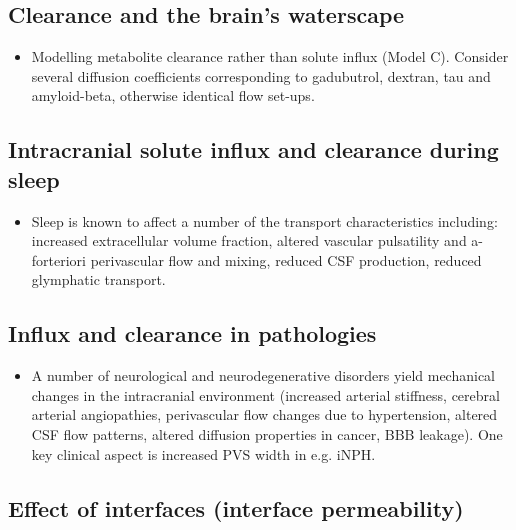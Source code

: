 \documentclass[fleqn,10pt]{wlscirep}
\newcommand{\draft}[1]{\textcolor{gray}{#1}}
\begin{document}
\draft{\lipsum[1]}

\subsection*{Clearance and the brain's waterscape}

\draft{\lipsum[1]}

\begin{itemize}
\item 
  Modelling metabolite clearance rather than solute influx (Model
  C). Consider several diffusion coefficients corresponding to
  gadubutrol, dextran, tau and amyloid-beta, otherwise identical flow
  set-ups.
\end{itemize}

\subsection*{Intracranial solute influx and clearance during sleep}

\begin{itemize}
\item
  Sleep is known to affect a number of the transport characteristics including: increased extracellular volume fraction, altered vascular pulsatility and a-forteriori perivascular flow and mixing, reduced CSF production, reduced glymphatic transport.
\end{itemize}

\draft{\lipsum[1]}

\subsection*{Influx and clearance in pathologies}

\begin{itemize}
\item
  A number of neurological and neurodegenerative disorders yield mechanical changes in the intracranial environment (increased arterial stiffness, cerebral arterial angiopathies, perivascular flow changes due to hypertension, altered CSF flow patterns, altered diffusion properties in cancer, BBB leakage). One key clinical aspect is increased PVS width in e.g. iNPH. 
\end{itemize}

\draft{\lipsum[1]}



\iffalse
\newpage
\subsection*{Effect of interfaces (interface permeability)}
\end{document}
